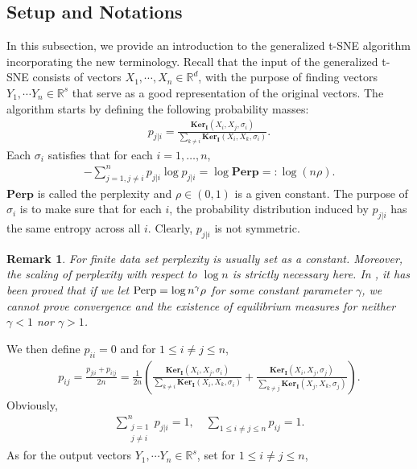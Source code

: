 \documentclass[10pt]{article}
\newtheorem{remark}{\bf Remark}
\newenvironment{Proof of lemma}{\noindent{\bf Proof of Lemma}}{\hfill$\Box$\newline}
\newenvironment{Proof of claim}{\noindent{\bf Proof of claim}}{\hfill$\Box$\newline}
\newenvironment{Proof of theorem}{\noindent{\bf Proof of Theorem}}{\hfill\scriptsize{$\Box$}\newline}
\newenvironment{Proof of theorems}{\noindent{\bf Proof of Theorems}}{\hfill$\Box$\newline}
\newenvironment{Proof of proposition}{\noindent{\bf Proof of Proposition}}{\hfill$\Box$\newline}
\newenvironment{Proof of propositions}{\noindent{\bf Proof of Propositions}}{\hfill$\Box$\newline}
\newenvironment{Proof of exercise}{\noindent{\it Proof of Exercise:}}{\hfill$\Box$}
\numberwithin{equation}{section}
\newcommand{\ki}{\mathbf{Ker}_{\mathbf{I}}}
\begin{document}
\subsection*{Setup and Notations} \label{tsne:sec:setup}
In this subsection, we provide an
introduction to the generalized t-SNE algorithm incorporating the new
terminology. Recall that the input of the generalized t-SNE consists of vectors
$X_1, \cdots, X_n \in \mathbb{R}^d$, with the purpose of finding vectors $Y_1,
    \cdots Y_n \in \mathbb{R}^s$ that serve as a good representation of the
original vectors. The algorithm starts by defining the following probability
masses:
\begin{align}
    p_{j|i} = \frac{\ki(X_i,X_j,\sigma_i)}{\sum_{k \neq i} \ki(X_i,X_k,\sigma_i)}.
\end{align}
Each $\sigma_i$ satisfies that for each $i = 1, \dots, n$,
\begin{align}
    -\sum_{j = 1, j \neq i}^n p_{j|i} \log p_{j|i} = \log \textbf{Perp} =: \log (n \rho).
\end{align}
$\textbf{Perp}$ is called the perplexity and $\rho \in (0,1)$ is a given constant. The purpose of $\sigma_i$ is to make sure that for each $i$, the probability distribution induced by $p_{j|i}$ has the same entropy across all $i$. Clearly, $p_{j|i}$ is not symmetric.
\begin{remark}
    For finite data set perplexity is usually set as a constant. Moreover, the scaling of perplexity with respect to $\log n$ is strictly necessary here. In \cite{murray2024largedatalimitsscaling}, it has been proved that if we let $\textbf{\normalfont Perp} = \log n^{\gamma} \rho$ for some constant parameter $\gamma$, we cannot prove convergence and the existence of equilibrium measures for neither $\gamma<1$ nor $\gamma >1$.
\end{remark}
We then define $p_{ii} = 0$ and for $1 \leq i \neq j \leq n$,
\begin{align}
    p_{ij} = \frac{p_{j|i} + p_{i|j}}{2n} = \frac{1}{2n}\left(\frac{\ki(X_i,X_j,\sigma_i)}{\sum_{k \neq i} \ki(X_i,X_k,\sigma_i)}+\frac{\ki(X_i,X_j,\sigma_j)}{\sum_{k \neq j} \ki(X_j,X_k,\sigma_j)}\right).
\end{align}
Obviously,
\begin{align}
    \sum_{\substack{j = 1 \\ j \neq i}}^n p_{j|i} = 1, \quad \sum_{1 \leq i \neq j \leq n} p_{ij} = 1.
\end{align}
As for the output vectors $Y_1, \cdots Y_n \in \mathbb{R}^s$, set for $1 \leq i \neq j \leq n$,
\end{document}
